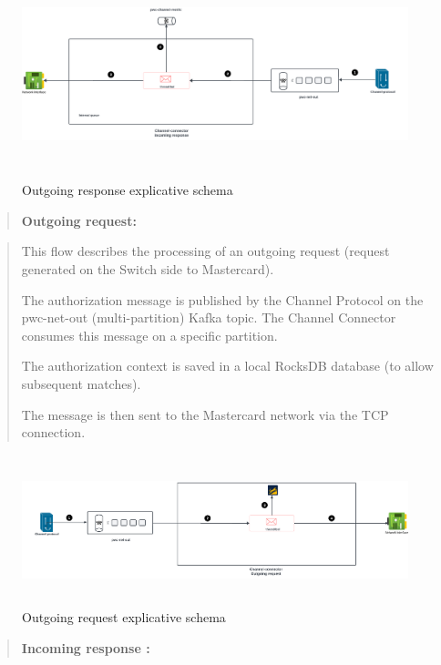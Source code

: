 \documentclass[12pt,a4paper]{report}
\begin{document}
\begin{figure}[H]
\centering
\includegraphics[width=6.84092in,height=2.37072in]{media/image53.png}
\caption{Outgoing response explicative schema}
\label{fig:ORES}
\end{figure}
 \clearpage

\begin{quote}
\textbf{Outgoing request:}
\end{quote}

\begin{quote}
This flow describes the processing of an outgoing request (request
generated on the Switch side to Mastercard).

The authorization message is published by the Channel Protocol on the
pwc-net-out (multi-partition) Kafka topic. The Channel Connector
consumes this message on a specific partition.

The authorization context is saved in a local RocksDB database (to allow
subsequent matches).

The message is then sent to the Mastercard network via the TCP
connection.
\end{quote}

\begin{figure}[H]
\centering
\includegraphics[width=6.78333in,height=1.72048in]{media/image54.png}
\caption{Outgoing request explicative schema}
\label{fig:ORES}
\end{figure}

\begin{quote}
\textbf{Incoming response :}
\end{quote}
\end{document}
